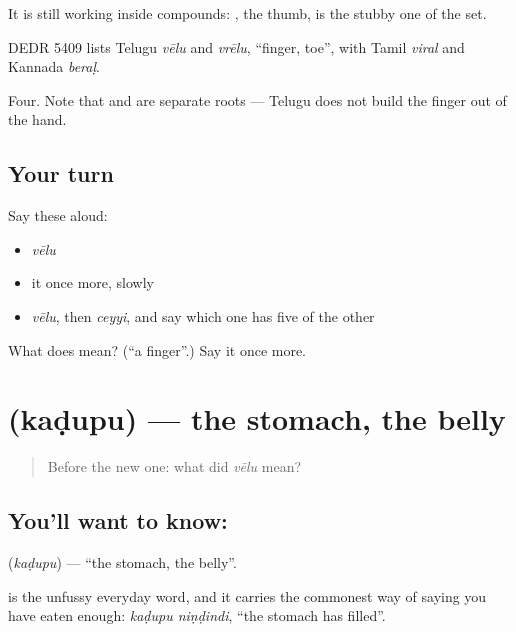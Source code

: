 It is still working inside compounds: , the thumb, is the stubby one of the set.

DEDR 5409 lists Telugu \emph{vēlu} and \emph{vrēlu}, \textquotedblleft{}finger, toe\textquotedblright{}, with Tamil \emph{viral} and Kannada \emph{beraḷ}.

\begin{grammarlens}[title={What you've built}]
Four. Note that  and  are separate roots — Telugu does not build the finger out of the hand.
\end{grammarlens}

\subsection*{Your turn}
Say these aloud:

\begin{itemize}
\raggedright
  \item \emph{vēlu}
  \item it once more, slowly
  \item \emph{vēlu}, then \emph{ceyyi}, and say which one has five of the other
\end{itemize}

\begin{tcolorbox}[breakable,colback=teal!4,colframe=teal!35!black,title={Before you move on}]
What does  mean? (\textquotedblleft{}a finger\textquotedblright{}.) Say it once more.
\end{tcolorbox}
\section[\texorpdfstring{\te{కడుపు} (kaḍupu)}{కడుపు (kaḍupu)}]{ (kaḍupu) — the stomach, the belly}

\label{lesson:TE-C47-stomach}



\begin{quote}
Before the new one: what did \emph{vēlu} mean?
\end{quote}

\subsection*{You'll want to know: }
\textbf{} (\emph{kaḍupu}) — \textquotedblleft{}the stomach, the belly\textquotedblright{}.

 is the unfussy everyday word, and it carries the commonest way of saying you have eaten enough: \emph{kaḍupu niṇḍindi}, \textquotedblleft{}the stomach has filled\textquotedblright{}.

